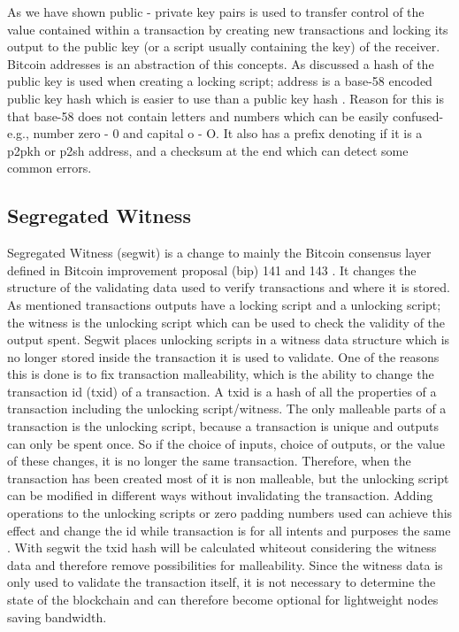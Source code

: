 As we have shown public - private key pairs is used to transfer control of the value contained within a transaction by creating new transactions and locking its output to the public key (or a script usually containing the key) of the receiver. Bitcoin addresses is an abstraction of this concepts. As discussed a hash of the public key is used when creating a locking script; address is a base-58 encoded public key hash which is easier to use than a public key hash \cite{antonopoulos2017mastering}. Reason for this is that base-58 does not contain letters and numbers which can be easily confused-e.g., number zero - 0 and capital o - O. It also has a prefix denoting if it is a p2pkh or p2sh address, and a checksum at the end which can detect some common errors.

\subsection{Segregated Witness}
\label{subsec:segwit}

Segregated Witness (segwit) is a change to mainly the Bitcoin consensus layer defined in Bitcoin improvement proposal (bip) 141 and 143 \cite{BIP141}\cite{BIP143}. It changes the structure of the validating data used to verify transactions and where it is stored. As mentioned transactions outputs have a locking script and a unlocking script; the witness is the unlocking script which can be used to check the validity of the output spent. Segwit places unlocking scripts in a witness data structure which is no longer stored inside the transaction it is used to validate. One of the reasons this is done is to fix transaction malleability, which is the ability to change the transaction id (txid) of a transaction. A txid is a hash of all the properties of a transaction including the unlocking script/witness. The only malleable parts of a transaction is the unlocking script, because a transaction is unique and outputs can only be spent once. So if the choice of inputs, choice of outputs, or the value of these changes, it is no longer the same transaction.
Therefore, when the transaction has been created most of it is non malleable, but the unlocking script can be modified in different ways without invalidating the transaction. Adding operations to the unlocking scripts or zero padding numbers used can achieve this effect and change the id while transaction is for all intents and purposes the same \cite{BIP62}. With segwit the txid hash will be calculated whiteout considering the witness data and therefore remove possibilities for malleability. Since the witness data is only used to validate the transaction itself, it is not necessary to determine the state of the blockchain and can therefore become optional for lightweight nodes saving bandwidth. 

